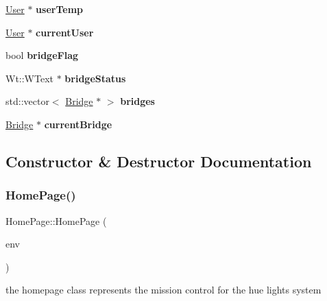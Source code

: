 \begin{DoxyCompactItemize}
\item 
\mbox{\label{class_home_page_a2906979431ad4c1349096e094388568a}} 
\hyperlink{class_user}{User} $\ast$ {\bfseries user\+Temp}
\item 
\mbox{\label{class_home_page_a4f3a9aca2e0316a4a0a7f392677faadb}} 
\hyperlink{class_user}{User} $\ast$ {\bfseries current\+User}
\item 
\mbox{\label{class_home_page_a3bfc1c6ab14d69799d3d39639697726d}} 
bool {\bfseries bridge\+Flag}
\item 
\mbox{\label{class_home_page_ab045455fa1d609cdafdc4cc3cad23062}} 
Wt\+::\+W\+Text $\ast$ {\bfseries bridge\+Status}
\item 
\mbox{\label{class_home_page_ae081130ece7aa9b6bba0cc72f793745f}} 
std\+::vector$<$ \hyperlink{class_bridge}{Bridge} $\ast$ $>$ {\bfseries bridges}
\item 
\mbox{\label{class_home_page_ab5d1ffbc1733044cfb176be7882e24f9}} 
\hyperlink{class_bridge}{Bridge} $\ast$ {\bfseries current\+Bridge}
\end{DoxyCompactItemize}


\subsection{Constructor \& Destructor Documentation}
\mbox{\label{class_home_page_ae0e5d76697b6796ee71c77555d330eea}} 
\subsubsection{\texorpdfstring{Home\+Page()}{HomePage()}}
{\footnotesize\ttfamily Home\+Page\+::\+Home\+Page (\begin{DoxyParamCaption}\item[{const Wt\+::\+W\+Environment \&}]{env }\end{DoxyParamCaption})}



the homepage class represents the mission control for the hue lights system 

